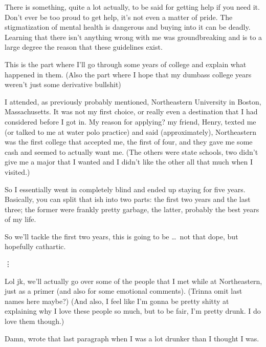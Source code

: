 \documentclass[./butidigress.tex]{subfiles}
\begin{document}
There is something, quite a lot actually, to be said for getting help if you need it.
Don't ever be too proud to get help, it's not even a matter of pride.
The stigmatization of mental health is dangerous and buying into it can be deadly.
Learning that there isn't anything wrong with me was groundbreaking and is to a large degree the reason that these guidelines exist.

\label{subsec:narrative}
This is the part where I'll go through some years of college and explain what happened in them.
(Also the part where I hope that my dumbass college years weren't just some derivative bullshit)

I attended, as previously probably mentioned, Northeastern University in Boston, Massachusetts.
It was not my first choice, or really even a destination that I had considered before I got in.
My reason for applying? my friend, Henry, texted me (or talked to me at water polo practice) and said (approximately), 
Northeastern was the first college that accepted me, the first of four, and they gave me some cash and seemed to actually want me.
(The others were state schools, two didn't give me a major that I wanted and I didn't like the other all that much when I visited.)

So I essentially went in completely blind and ended up staying for five years.
Basically, you can split that ish into two parts: the first two years and the last three; the former were frankly pretty garbage, the latter, probably the best years of my life.

So we'll tackle the first two years, this is going to be \ldots\ not that dope, but hopefully cathartic.

\vdots

Lol jk, we'll actually go over some of the people that I met while at Northeastern, just as a primer (and also for some emotional comments).
(Trinna omit last names here maybe?)
(And also, I feel like I'm gonna be pretty shitty at explaining why I love these people so much, but to be fair, I'm pretty drunk.
I do love them though.)

Damn, wrote that last paragraph when I was a lot drunker than I thought I was.
\end{document}

